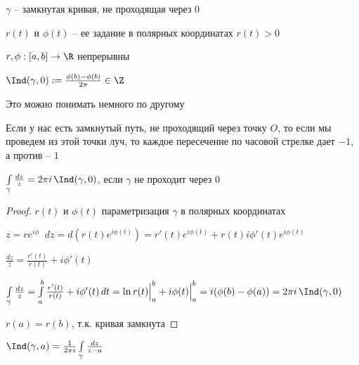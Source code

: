 
\begin{definition}\thmslashn
	
	$\gamma$ -- замкнутая кривая, не проходящая через $0$
	
	$r(t)$ и $\phi(t)$ -- ее задание в полярных координатах $r(t) > 0$
	
	$r, \phi : [a,b] \to \R$ непрерывны
	
	$\Ind(\gamma, 0) := \frac{\phi(b) - \phi(b)}{2\pi} \in \Z$
	
\end{definition}

\begin{remark}\thmslashn
	
	Это можно понимать немного по другому
	
	Если у нас есть замкнутый путь, не проходящий через точку $O$, то если мы проведем из этой точки луч, то каждое пересечение по часовой стрелке дает $-1$, а против -- $1$
	
\end{remark}

\begin{theorem}\thmslashn
	
	$\int\limits_\gamma \frac{dz}{z} = 2\pi i \, \Ind(\gamma, 0)$, если $\gamma$ не проходит через $0$
	
\end{theorem}

\begin{proof}\thmslashn
	
	$r(t)$ и $\phi(t)$ параметризация $\gamma$ в полярных координатах 
	
	$z = re^{i\phi}\;\; dz = d(r(t)e^{i\phi(t)}) = r'(t) e^{i\phi(t)} + r(t)i\phi'(t)e^{i\phi(t)}$

	$\frac{dz}{z} = \frac{r'(t)}{r(t)} + i\phi'(t)$
	
	$\int\limits_\gamma \frac{dz}{z} = \int\limits_a^b  \frac{r'(t)}{r(t)} + i\phi'(t)\,dt = \ln r(t)\Big|_a^b + i\phi(t)\Big|_a^b = i (\phi(b) - \phi(a)) = 2\pi i \, \Ind(\gamma, 0)$
	
	$r(a) = r(b)$, т.к. кривая замкнута

\end{proof}

\begin{consequence}\thmslashn
	
	$\Ind(\gamma, a) = \frac{1}{2\pi i}\int\limits_\gamma \frac{dz}{z-a}$
	
\end{consequence}


